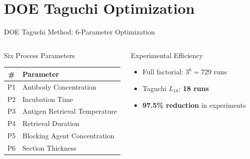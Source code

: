 \documentclass[aspectratio=169,10pt]{beamer}
\begin{document}
\section{DOE Taguchi Optimization}
\begin{frame}{DOE Taguchi Method: 6-Parameter Optimization}
  \begin{columns}[T]
      \begin{block}{Six Process Parameters}
        \footnotesize
        \begin{tabular}{@{}cl@{}}
          \toprule
          \# & Parameter \\
          \midrule
          P1 & Antibody Concentration \\
          P2 & Incubation Time \\
          P3 & Antigen Retrieval Temperature \\
          P4 & Retrieval Duration \\
          P5 & Blocking Agent Concentration \\
          P6 & Section Thickness \\
          \bottomrule
        \end{tabular}
      \end{block}
      \vspace{0.1cm}
      \begin{block}{Experimental Efficiency}
        \small
        \begin{itemize}
          \item Full factorial: $3^{6} = 729$ runs
          \item Taguchi $L_{18}$: \textbf{18 runs}
          \item \textbf{97.5\% reduction} in experiments
        \end{itemize}
      \end{block}


\end{columns}
\end{frame}
\end{document}
